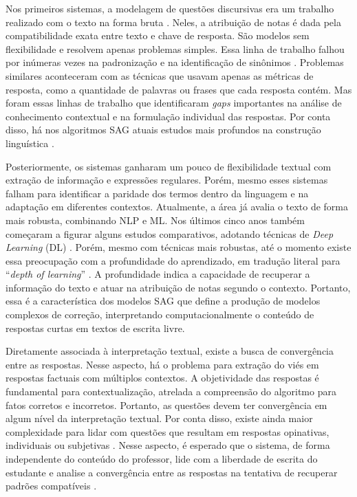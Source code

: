 Nos primeiros sistemas, a modelagem de questões discursivas era um trabalho realizado com o texto na forma bruta \cite{perez-marin2009}. Neles, a atribuição de notas é dada pela compatibilidade exata entre texto e chave de resposta. São modelos sem flexibilidade e resolvem apenas problemas simples. Essa linha de trabalho falhou por inúmeras vezes na padronização e na identificação de sinônimos \cite{leffa2003}. Problemas similares aconteceram com as técnicas que usavam apenas as métricas de resposta, como a quantidade de palavras ou frases que cada resposta contém. Mas foram essas linhas de trabalho que identificaram \textit{gaps} importantes na análise de conhecimento contextual e na formulação individual das respostas. Por conta disso, há nos algoritmos SAG atuais estudos mais profundos na construção linguística \cite{filighera2020}.

Posteriormente, os sistemas ganharam um pouco de flexibilidade textual com extração de informação e expressões regulares. Porém, mesmo esses sistemas falham para identificar a paridade dos termos dentro da linguagem e na adaptação em diferentes contextos. Atualmente, a área já avalia o texto de forma mais robusta, combinando NLP e ML. Nos últimos cinco anos também começaram a figurar alguns estudos comparativos, adotando técnicas de \textit{Deep Learning} (DL) \cite{bonthu2021}. Porém, mesmo com técnicas mais robustas, até o momento existe essa preocupação com a profundidade do aprendizado, em tradução literal para ``\textit{depth of learning}'' \cite{burrows2015}. A profundidade indica a capacidade de recuperar a informação do texto e atuar na atribuição de notas segundo o contexto. Portanto, essa é a característica dos modelos SAG que define a produção de modelos complexos de correção, interpretando computacionalmente o conteúdo de respostas curtas em textos de escrita livre.

Diretamente associada à interpretação textual, existe a busca de convergência entre as respostas. Nesse aspecto, há o problema para extração do viés em respostas factuais com múltiplos contextos. A objetividade das respostas é fundamental para contextualização, atrelada a compreensão do algoritmo para fatos corretos e incorretos. Portanto, as questões devem ter convergência em algum nível da interpretação textual. Por conta disso, existe ainda maior complexidade para lidar com questões que resultam em respostas opinativas, individuais ou subjetivas \cite{bailey2008}. Nesse aspecto, é esperado que o sistema, de forma independente do conteúdo do professor, lide com a liberdade de escrita do estudante e analise a convergência entre as respostas na tentativa de recuperar padrões compatíveis \cite{saha2018, lui2022}.

